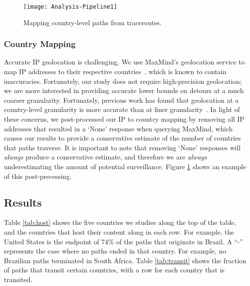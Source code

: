 \begin{figure}[t]
\centering
\texttt{[image: Analysis-Pipeline1]}
\caption{Mapping country-level paths from traceroutes.}
\label{fig:analysis_pipeline}
\end{figure}


\subsubsection{Country Mapping}
\label{c_map}

Accurate IP geolocation is challenging. We use MaxMind's
geolocation service to map IP addresses to their respective
countries~\cite{maxmind}, which is known to contain inaccuracies.
Fortunately, our study does not require high-precision geolocation; we
are more interested in providing accurate lower bounds on detours at a
much coarser granularity.  Fortunately, previous work has found that
geolocation at a country-level granularity is more accurate than at
finer granularity~\cite{huffaker2011geocompare}.  In light of these
concerns, we post-processed our IP to country mapping
by removing all IP addresses that resulted in a `None' response when
querying MaxMind, which causes our results to provide a conservative
estimate of the number of countries that paths traverse. It is important
to note that removing `None' responses will \textit{always} produce a
conservative estimate, and therefore we are \textit{always}
underestimating the amount of potential surveillance.  
Figure \ref{fig:analysis_pipeline} shows an example of this
post-precessing. 

\subsection{Results}



Table \ref{tab:host} shows the five countries we studies along the top
of the table, and the countries that host their content along in each
row.  For example, the United States is the endpoint of 74\% of the
paths that originate in Brazil.  A ``-'' represents the case where no
paths ended in that country.  For example, no Brazilian paths terminated in
South Africa. Table \ref{tab:transit} shows the fraction of paths that
transit certain countries, with a row for each country that is transited.

